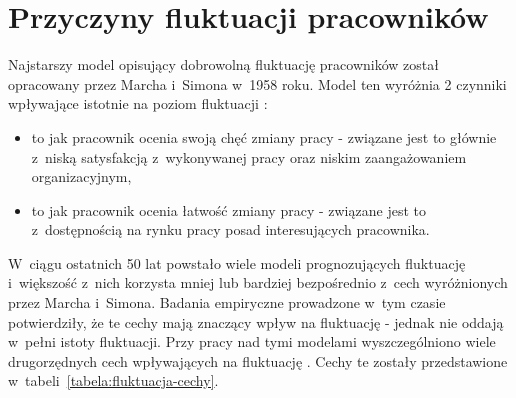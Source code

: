 \clearpage


\section{Przyczyny fluktuacji pracowników}\label{sec:czynniki-wplywajace-na-fluktuacje}

Najstarszy model opisujący dobrowolną fluktuację pracowników został opracowany przez Marcha i~Simona w~1958 roku.
Model ten wyróżnia 2 czynniki wpływające istotnie na poziom fluktuacji \cite{wozniak-2012}:
\begin{itemize}
    \item to jak pracownik ocenia swoją chęć zmiany pracy - związane jest to głównie z~niską satysfakcją z~wykonywanej pracy oraz niskim zaangażowaniem organizacyjnym,
    \item to jak pracownik ocenia łatwość zmiany pracy - związane jest to z~dostępnością na rynku pracy posad interesujących pracownika.
\end{itemize}

W~ciągu ostatnich 50 lat powstało wiele modeli prognozujących fluktuację i~większość z~nich korzysta mniej lub bardziej bezpośrednio z~cech wyróżnionych przez Marcha i~Simona.
Badania empiryczne prowadzone w~tym czasie potwierdziły, że te cechy mają znaczący wpływ na fluktuację - jednak nie oddają w~pełni istoty fluktuacji.
Przy pracy nad tymi modelami wyszczególniono wiele drugorzędnych cech wpływających na fluktuację \cite{steel-2009}.
Cechy te zostały przedstawione w~tabeli~\ref{tabela:fluktuacja-cechy}.

